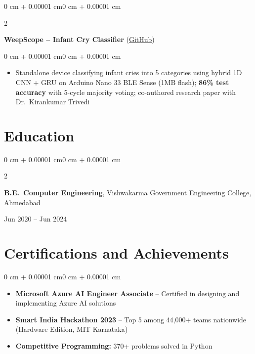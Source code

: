\documentclass[10pt, letterpaper]{article}
\newenvironment{highlights}{
    \begin{itemize}[
        topsep=0.01 cm,
        parsep=0.01 cm,
        partopsep=0pt,
        itemsep=0pt,
        leftmargin=0 cm + 10pt
    ]
}{
    \end{itemize}
}
\newenvironment{highlightsforbulletentries}{
    \begin{itemize}[
        topsep=0.01 cm,
        parsep=0.01 cm,
        partopsep=0pt,
        itemsep=0pt,
        leftmargin=10pt
    ]
}{
    \end{itemize}
}
\newenvironment{onecolentry}{
    \begin{adjustwidth}{0 cm + 0.00001 cm}{0 cm + 0.00001 cm}
}{
    \end{adjustwidth}
}
\newenvironment{twocolentry}[2][]{
    \onecolentry
    \def\secondColumn{#2}
    \setcolumnwidth{\fill, 5.5 cm}
    \begin{paracol}{2}
}{
    \switchcolumn \raggedleft \secondColumn
    \end{paracol}
    \endonecolentry
}
\let\hrefWithoutArrow\href
\begin{document}
        \vspace{0.05 cm}

        \begin{twocolentry}{
            2023
        }
            \textbf{WeepScope -- Infant Cry Classifier} (\hrefWithoutArrow{https://github.com/amit-gohel/Weep-Scope}{GitHub})
        \end{twocolentry}

        \vspace{0.02 cm}
        \begin{onecolentry}
            \begin{highlights}
                \item Standalone device classifying infant cries into 5 categories using hybrid 1D CNN + GRU on Arduino Nano 33 BLE Sense (1MB flash); \textbf{86\% test accuracy} with 5-cycle majority voting; co-authored research paper with Dr.\ Kirankumar Trivedi
            \end{highlights}
        \end{onecolentry}

    \section{Education}

        \begin{twocolentry}{
            Jun 2020 -- Jun 2024
        }
            \textbf{B.E.\ Computer Engineering}, Vishwakarma Government Engineering College, Ahmedabad
        \end{twocolentry}

    \section{Certifications and Achievements}

    \begin{onecolentry}
        \begin{highlightsforbulletentries}
            \item \textbf{Microsoft Azure AI Engineer Associate} -- Certified in designing and implementing Azure AI solutions
            \item \textbf{Smart India Hackathon 2023} -- Top 5 among 44,000+ teams nationwide (Hardware Edition, MIT Karnataka)
            \item \textbf{Competitive Programming:} 370+ problems solved in Python
        \end{highlightsforbulletentries}
    \end{onecolentry}
\end{document}
